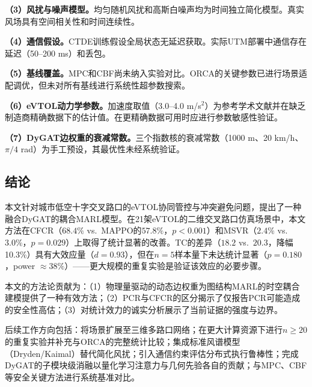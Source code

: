 \documentclass[12pt,a4paper,UTF8]{ctexart}
\begin{document}
\textbf{（3）风扰与噪声模型。}均匀随机风扰和高斯白噪声均为时间独立简化模型。真实风场具有空间相关性和时间连续性。

\textbf{（4）通信假设。}CTDE训练假设全局状态无延迟获取。实际UTM部署中通信存在延迟（50--200 ms）和丢包。

\textbf{（5）基线覆盖。}MPC和CBF尚未纳入实验对比。ORCA的关键参数已进行场景适配调优，但未对所有基线进行系统性超参数搜索。

\textbf{（6）eVTOL动力学参数。}加速度取值（3.0--4.0 m/s$^2$）为参考学术文献\cite{ref25}并在缺乏制造商精确数据下的估计值。在更精确数据可用时应进行参数敏感性验证。

\textbf{（7）DyGAT边权重的衰减常数。}三个指数核的衰减常数（1000 m、20 km/h、$\pi/4$ rad）为手工预设，其最优性未经系统验证。

\subsection{结论}

本文针对城市低空十字交叉路口的eVTOL协同管控与冲突避免问题，提出了一种融合DyGAT的耦合MARL模型。在21架eVTOL的二维交叉路口仿真场景中，本文方法在CFCR（$68.4\%$ vs.\ MAPPO的$57.8\%$，$p<0.001$）和MSVR（$2.4\%$ vs.\ $3.0\%$，$p=0.029$）上取得了统计显著的改善。TC的差异（$18.2$ vs.\ $20.3$，降幅10.3\%）具有大效应量（$d=0.93$），但在$n=5$样本量下未达统计显著（$p=0.180$，power $\approx38\%$）——更大规模的重复实验是验证该效应的必要步骤。

本文的方法论贡献为：（1）物理量驱动的动态边权重为图结构MARL的时空耦合建模提供了一种有效方法；（2）PCR与CFCR的区分揭示了仅报告PCR可能造成的安全性高估；（3）对统计效力的诚实分析展示了当前证据的强度与边界。

后续工作方向包括：将场景扩展至三维多路口网络；在更大计算资源下进行$n\geq20$的重复实验并补充与ORCA的完整统计比较；集成标准风谱模型（Dryden/Kaimal）替代简化风扰；引入通信约束评估分布式执行鲁棒性；完成DyGAT的子模块级消融以量化学习注意力与几何先验各自的贡献；与MPC、CBF等安全关键方法进行系统基准对比。
\end{document}
